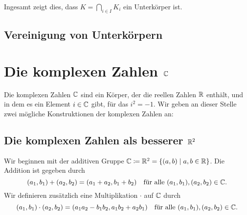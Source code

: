Ingesamt zeigt dies, dass $K = \bigcap_{i \in I} K_i$ ein Unterkörper ist.


\subsection{Vereinigung von Unterkörpern}





\section{Die komplexen Zahlen \texorpdfstring{$\mathbb{C}$}{C}}
Die komplexen Zahlen $\mathbb{C}$ sind ein Körper, der die reellen Zahlen $\mathbb{R}$ enthält, und in dem es ein Element $i \in \mathbb{C}$ gibt, für das $i^2 = -1$. Wir geben an dieser Stelle zwei mögliche Konstruktionen der komplexen Zahlen an:



\subsection{Die komplexen Zahlen als besserer \texorpdfstring{$\mathbb{R}^2$}{R2}}\label{subsec: C as R2}
Wir beginnen mit der additiven Gruppe $\mathbb{C} \coloneqq \mathbb{R}^2 = \{(a,b) \mid a,b \in \mathbb{R}\}$. Die Addition ist gegeben durch
\[
 (a_1, b_1) + (a_2, b_2) = (a_1 + a_2, b_1 + b_2)
 \quad\text{für alle $(a_1, b_1), (a_2, b_2) \in \mathbb{C}$}.
\]
Wir definieren zusätzlich eine Multiplikation $\cdot$ auf $\mathbb{C}$ durch
\[
 (a_1, b_1) \cdot (a_2, b_2)
 = (a_1 a_2 - b_1 b_2, a_1 b_2 + a_2 b_1)
 \quad\text{für alle $(a_1, b_1), (a_2, b_2) \in \mathbb{C}$}.
\]

